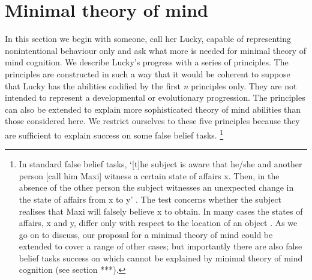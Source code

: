 \documentclass[12pt,\papersize]{extarticle}
\begin{document}







\section{Minimal theory of mind}

In this section we begin with someone, call her Lucky, capable  of representing nonintentional behaviour only and ask what more is needed for minimal theory of mind cognition.  We describe Lucky’s progress with a series of principles. The principles are constructed in such a way that it would be coherent to suppose that Lucky has the abilities codified by the first \textit{n} principles only. They are not intended to represent a developmental or evolutionary progression.  The principles can also be extended to explain more sophisticated theory of mind abilities than those considered here.  We restrict ourselves to these five principles because they are sufficient to explain success on some false belief tasks.%
\footnote{
In standard false belief tasks, `[t]he subject is aware that he/she and another person [call him Maxi] witness a certain state of affairs x.  Then, in the absence of the other person the subject witnesses an unexpected change in the state of affairs from x to y' \citep[][p.\ 106]{en_89}.  The test concerns whether the subject realises that Maxi will falsely believe x to obtain.  In many cases the states of affairs, x and y, differ only with respect to the location of an object \citep[e.g.][]{en_1092, en_1208, en_1824}. 
As we go on to discuss, our proposal for a minimal theory of mind could be extended to cover a range of other cases;
but importantly there are also false belief tasks success on which cannot be explained by minimal theory of mind cognition (see section ***).
}
\end{document}
